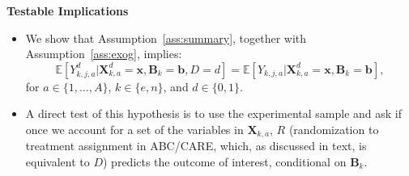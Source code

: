 \documentclass[static]{JJH-Beamer}
\begin{document}
\begin{frame}
 \addtocounter{framenumber}{-1}

\hypertarget{creamcheese}{}
\begin{center}
\textbf{Testable Implications}
\end{center}

\end{frame}

\begin{frame}
 \addtocounter{framenumber}{-1}

\begin{itemize}
\item We show that Assumption~\ref{ass:summary}, together with Assumption~\ref{ass:exog}, implies:
    \begin{equation}\label{eq:invariancetestapp}
    \mathbb{E} \left[ Y_{k,j,a}^d | \bm{X}_{k,a}^d  = \bm{x}, \bm{B}_k = \bm{b}, D = d \right] = \mathbb{E} \left[ Y_{k,j,a} | \bm{X}^d_{k,a}  = \bm{x}, \bm{B}_k = \bm{b} \right],
    \end{equation}
    for $a \in \{1,\dots,A\}$, $k \in \{e,n\}$, and $d \in \{0,1\}$.
\end{itemize}

\end{frame}

\begin{frame}
 \addtocounter{framenumber}{-1}

\begin{itemize}
\item A direct test of this hypothesis is to use the experimental sample and ask if once we account for a set of the variables in $\bm{X}_{k,a}$, $R$ (randomization to treatment assignment in ABC/CARE, which, as discussed in text, is equivalent to $D$) predicts the outcome of interest, conditional on $\bm{B}_k$.
\end{itemize}

\end{frame}
\end{document}
